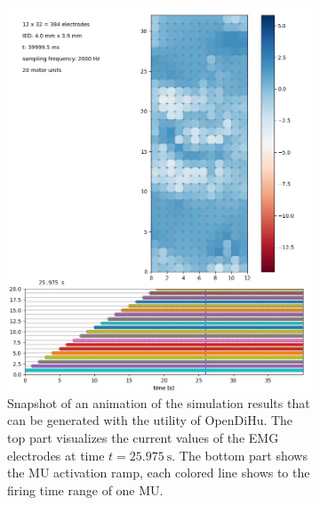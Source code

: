 \begin{figure}
  \centering%
  \begin{subfigure}[t]{0.6\textwidth}%
    \centering%
    \includegraphics[width=\textwidth]{images/results/application/emg_video_37.png}%
    \caption{Snapshot of an animation of the simulation results that can be generated with the utility of OpenDiHu. The top part visualizes the current values of the EMG electrodes at time $t=\SI{25.975}{\s}$. The bottom part shows the MU activation ramp, each colored line shows to the firing time range of one MU.}%
    \label{fig:emg_video_37}%
  \end{subfigure}  \,
  \begin{subfigure}[t]{0.38\textwidth}%
    \centering%

\end{subfigure}
\end{figure}
